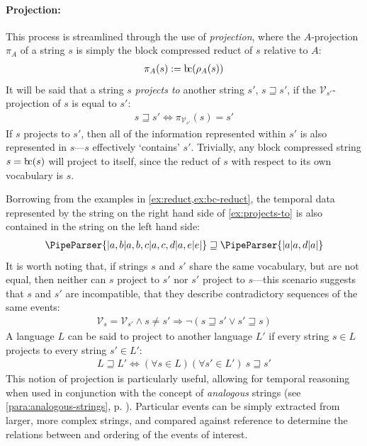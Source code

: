 \documentclass[a4paper,12pt,leqno]{article}
\newcommand{\bc}{{\rm b\!c}}
\newcommand{\vph}[1]{\vphantom{#1}}
\newcommand{\ebox}[1]{\fbox{$\vph{'(),}#1$}}
\newcommand{\V}{\mathcal{V}}
\newcommand{\EventString}[1]{%
	\renewcommand*{\do}[1]{\ebox{##1}}%
	\PipeParser{#1}%
}
\begin{document}
\paragraph{Projection:}\label{para:str-op-projection}
This process is streamlined through the use of \textit{projection}, where the $A$-projection $\pi_A$ of a string $s$ is simply the block compressed reduct of $s$ relative to $A$:
\begin{align}
	\pi_A(s) := \bc(\rho_A(s))
\end{align}
It will be said that a string $s$ \textit{projects to} another string $s'$, $s \sqsupseteq s'$, if the $\V_{s'}$-projection of $s$ is equal to $s'$:
\begin{align}
	s \sqsupseteq s' \Longleftrightarrow  \pi_{\V_{s'}}(s) = s'
\end{align}
If $s$ projects to $s'$, then all of the information represented within $s'$ is also represented in $s$---$s$ effectively `contains' $s'$. Trivially, any block compressed string $s = \bc(s)$ will project to itself, since the reduct of $s$ with respect to its own vocabulary is $s$.

Borrowing from the examples in \cref{ex:reduct,ex:bc-reduct}, the temporal data represented by the string on the right hand side of \cref{ex:projects-to} is also contained in the string on the left hand side:
\begin{align}\label{ex:projects-to}
	\EventString{{}|a,b|a,b,c|a,c,d|a,e|e|{}} \sqsupseteq \EventString{{}|a|a,d|a|{}}
\end{align}
It is worth noting that, if strings $s$ and $s'$ share the same vocabulary, but are not equal, then neither can $s$ project to $s'$ nor $s'$ project to $s$---this scenario suggests that $s$ and $s'$ are incompatible, that they describe contradictory sequences of the same events:
\begin{align}\label{impl:cannot-project}
	\V_s = \V_{s'} \wedge s \neq s' \Longrightarrow \lnot (s \sqsupseteq s' \lor s' \sqsupseteq s)
\end{align}
A language $L$ can be said to project to another language $L'$ if every string $s \in L$ projects to every string $s' \in L'$:
\begin{align}
	L \sqsupseteq L' \Longleftrightarrow  (\forall s \in L)(\forall s' \in L')~s \sqsupseteq s'
\end{align}
This notion of projection is particularly useful, allowing for temporal reasoning when used in conjunction with the concept of \textit{analogous} strings (see \cref{para:analogous-strings}, p. \pageref{para:analogous-strings}). Particular events can be simply extracted from larger, more complex strings, and compared against reference to determine the relations between and ordering of the events of interest.
\end{document}
